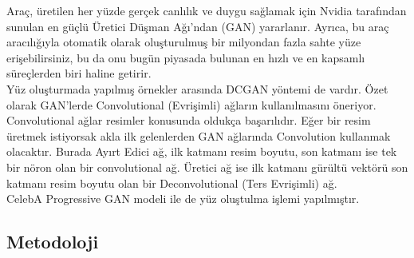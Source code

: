 \documentclass[12pt, a4paper]{article}
\begin{document}
\begin{flushleft}
	Araç, üretilen her yüzde gerçek canlılık ve duygu sağlamak için Nvidia tarafından sunulan en güçlü Üretici Düşman Ağı'ndan (GAN) yararlanır. Ayrıca, bu araç aracılığıyla otomatik olarak oluşturulmuş bir milyondan fazla sahte yüze erişebilirsiniz, bu da onu bugün piyasada bulunan en hızlı ve en kapsamlı süreçlerden biri haline getirir.
	\\Yüz oluşturmada yapılmış örnekler arasında DCGAN yöntemi de vardır\cite{DCGAN-Face-Generator.ipynb-2024-03-13}. Özet olarak GAN’lerde Convolutional (Evrişimli) ağların kullanılmasını öneriyor. Convolutional ağlar resimler konusunda oldukça başarılıdır. Eğer bir resim üretmek istiyorsak akla ilk gelenlerden GAN ağlarında Convolution kullanmak olacaktır. Burada Ayırt Edici ağ, ilk katmanı resim boyutu, son katmanı ise tek bir nöron olan bir convolutional ağ. Üretici ağ ise ilk katmanı gürültü vektörü son katmanı resim boyutu olan bir Deconvolutional (Ters Evrişimli) ağ.
	\\CelebA Progressive GAN modeli ile de yüz oluştulma işlemi yapılmıştır\cite{Generate-2024-03-13}. 
	\end{flushleft}
\begin{center}
		\section{Metodoloji}
\end{center}
\end{document}
